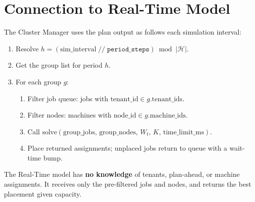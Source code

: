 \documentclass[11pt,a4paper]{article}
\newcommand{\PH}{\mathcal{H}}
\begin{document}
\section{Connection to Real-Time Model}

The Cluster Manager uses the plan output as follows each simulation interval:
\begin{enumerate}
  \item Resolve $h = (\text{sim\_interval} \;\mathbin{/\!/}\; \texttt{period\_steps}) \bmod |\PH|$.
  \item Get the group list for period $h$.
  \item For each group $g$:
    \begin{enumerate}[label=(\alph*)]
      \item Filter job queue: jobs with $\text{tenant\_id}\in g.\text{tenant\_ids}$.
      \item Filter nodes: machines with $\text{node\_id}\in g.\text{machine\_ids}$.
      \item Call $\mathrm{solve}(\text{group\_jobs},\,\text{group\_nodes},\,W_t,\,K,\,\text{time\_limit\_ms})$.
      \item Place returned assignments; unplaced jobs return to queue with a wait-time bump.
    \end{enumerate}
\end{enumerate}

The Real-Time model has \textbf{no knowledge} of tenants, plan-ahead, or machine assignments.
It receives only the pre-filtered jobs and nodes, and returns the best placement given capacity.
\end{document}
